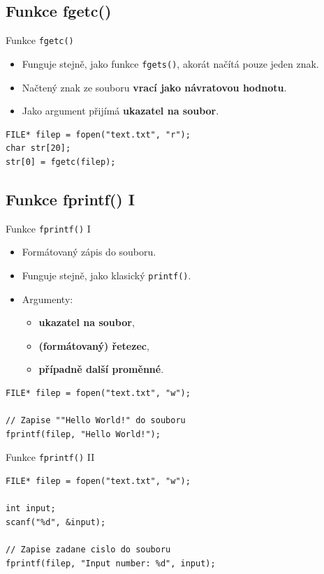 \documentclass[14pt,aspectratio=169]{beamer}
\begin{document}
    \subsection{Funkce fgetc()}
    \begin{frame}[t,fragile]{Funkce \texttt{fgetc()}}
        \begin{itemize}
            \item Funguje stejně, jako funkce \texttt{fgets()}, akorát načítá pouze jeden znak.
            \item Načtený znak ze souboru \textbf{vrací jako návratovou hodnotu}.
            \item Jako argument přijímá \textbf{ukazatel na soubor}.
        \end{itemize}
        \begin{lstlisting}
FILE* filep = fopen("text.txt", "r");
char str[20];
str[0] = fgetc(filep);
        \end{lstlisting}
    \end{frame}

    \subsection{Funkce fprintf() \textrm{I}}
    \begin{frame}[t,fragile]{Funkce \texttt{fprintf()} \textrm{I}}
        \begin{itemize}
            \item Formátovaný zápis do souboru.
            \item Funguje stejně, jako klasický \texttt{printf()}.
            \item Argumenty:
            \begin{itemize}
                \item \textbf{ukazatel na soubor},
                \item \textbf{(formátovaný) řetezec},
                \item \textbf{případně další proměnné}.
            \end{itemize}
        \end{itemize}
        \begin{lstlisting}
FILE* filep = fopen("text.txt", "w");

// Zapise ""Hello World!" do souboru
fprintf(filep, "Hello World!");
        \end{lstlisting}
    \end{frame}

    \begin{frame}[fragile]{Funkce \texttt{fprintf()} \textrm{II}}
        \begin{lstlisting}
FILE* filep = fopen("text.txt", "w");

int input;
scanf("%d", &input);

// Zapise zadane cislo do souboru
fprintf(filep, "Input number: %d", input);
        \end{lstlisting}
    \end{frame}
\end{document}

